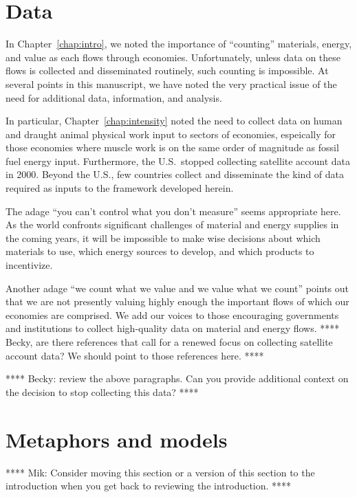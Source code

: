 \section{Data}
\label{sec:Data}

In Chapter~\ref{chap:intro}, we noted the importance of ``counting''
materials, energy, and value as each flows through economies.  
Unfortunately, unless data on these flows 
is collected and disseminated routinely, 
such counting is impossible.
At several points in this manuscript,
we have noted the very practical issue of the
need for additional data, information, and analysis.

In particular, Chapter~\ref{chap:intensity} noted the need to collect
data on human and draught animal physical work input to 
sectors of economies, espeically for those economies where 
muscle work is on the same order of magnitude 
as fossil fuel energy input.
Furthermore, the U.S.\ stopped collecting 
satellite account data in 2000. 
Beyond the U.S., few countries collect and disseminate
the kind of data required as inputs to the framework
developed herein.

The adage ``you can't control what you don't measure''
seems appropriate here. 
As the world confronts significant challenges
of material and energy supplies in the coming years,
it will be impossible to make wise decisions about
which materials to use,
which energy sources to develop, and 
which products to incentivize.

Another adage ``we count what we value and we value what we count''
points out that we are not presently valuing highly enough
the important flows of which our economies are comprised.
We add our voices to those encouraging governments and 
institutions to collect high-quality data on material 
and energy flows.
**** Becky, are there references that call for a renewed focus on 
collecting satellite account data? 
We should point to those references here. ****
 
**** Becky: review the above paragraphs.
Can you provide additional context on the decision
to stop collecting this data? ****


\section{Metaphors and models}
\label{sec:mataphors_and_models}

**** Mik: Consider moving this section or a version of this section 
to the introduction when you get back to reviewing the introduction. ****

